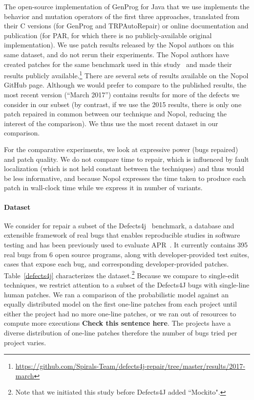 \documentclass[conference]{IEEEtran}
\newcommand{\todo}[1]
  {{\scriptsize \textbf{\color{red} {#1}}}}
\begin{document}
The open-source implementation of GenProg for Java that we use implements 
the behavior and mutation operators of the first three approaches, translated
from their C versions (for GenProg and TRPAutoRepair) or online documentation
and publication (for PAR, for which there is no publicly-available original implementation).  We use patch results released
by the Nopol authors on this same dataset, and do not rerun their experiments.
The Nopol authors have created patches for the same benchmark used in
this study~\cite{martinez2016} and made their results publicly
available.\footnote{\url{https://github.com/Spirals-Team/defects4j-repair/tree/master/results/2017-march}}
There are several sets of results available on the Nopol GitHub page.
Although we would prefer to compare to the published results, 
the most recent version (``March 2017'') contains results for more of the defects we
consider in our subset (by contrast, if we use the 2015 results, there is only
one patch repaired in common between our technique and Nopol, reducing the
interest of the comparison).  We thus use the most recent dataset in our comparison.

For the comparative experiments, we look at expressive power (bugs repaired) and
patch quality.  We do not compare time to repair, which is influenced by fault
localization (which is not held constant between the techniques) and thus would
be less informative, and because Nopol expresses the time taken to produce each patch in wall-clock time while we express it in number of variants.

\paragraph{Dataset}
We consider for repair a subset of the Defects4j~\cite{just14}
benchmark, a database and extensible 
framework of real bugs that enables reproducible studies in software testing and
has been previously used to evaluate APR~\cite{martinez2016}. 
It currently contains 395 real bugs from 6
open source programs, along with developer-provided test suites, cases that
expose each bug,  and
corresponding developer-provided patches.  Table~\ref{defects4j} characterizes
the dataset.\footnote{Note that we initiated this study before Defects4J added
 ``Mockito".} Because we compare to single-edit techniques, we
restrict attention to a subset of the Defects4J bugs with single-line human
patches. We ran a comparison of the probabilistic model against an equally distributed model on the first one-line patches from each project until either the project had no more one-line patches, or we ran out of resources to compute more executions \todo{Check this sentence here}. The projects have a diverse distribution of one-line patches therefore the number of bugs tried per project varies. 
\end{document}

